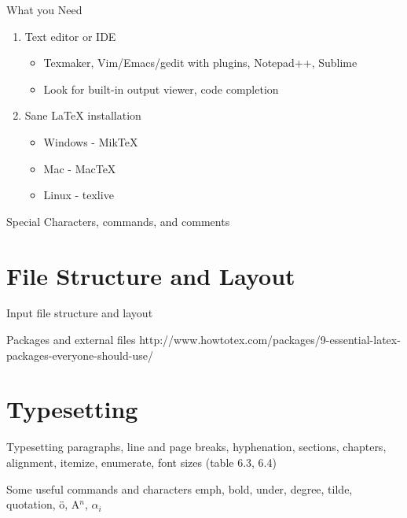 \documentclass[11pt]{beamer}
\begin{document}
%
%
\begin{frame}{What you Need}
\begin{enumerate}
	\item Text editor or IDE
	\begin{itemize}
		\item Texmaker, Vim/Emacs/gedit with plugins, Notepad++, Sublime
		\item Look for built-in output viewer, code completion
	\end{itemize}
	\item Sane \LaTeX{} installation
	\begin{itemize}
		\item Windows - MikTeX
		\item Mac - MacTeX
		\item Linux - texlive
	\end{itemize}
\end{enumerate}
\end{frame}

%
%
\begin{frame}{Special Characters, commands, and comments}

\end{frame}

%
%
\section{File Structure and Layout}
\begin{frame}{Input file structure and layout}

\end{frame}

%
%
\begin{frame}{Packages and external files}
http://www.howtotex.com/packages/9-essential-latex-packages-everyone-should-use/
\end{frame}

%
%
\section{Typesetting}
\begin{frame}{Typesetting}
paragraphs, line and page breaks, hyphenation, sections, chapters, alignment, itemize, enumerate, font sizes (table 6.3, 6.4)
\end{frame}

%
%
\begin{frame}{Some useful commands and characters}
emph, bold, under, degree, tilde, quotation, \"{o}, A$^{n}$, $\alpha_i$
\end{frame}
\end{document}
